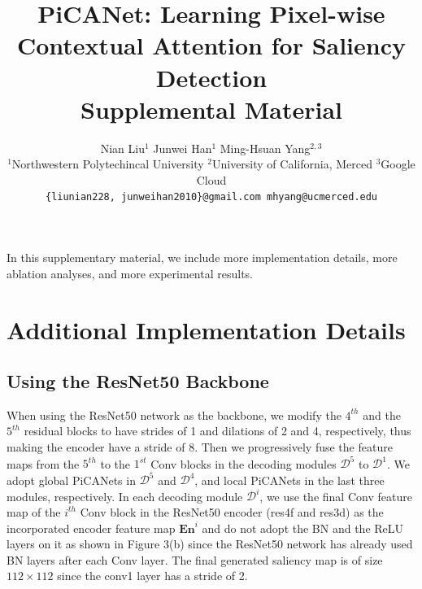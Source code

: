 \documentclass[10pt,twocolumn,letterpaper]{article}
\begin{document}
\title{PiCANet: Learning Pixel-wise Contextual Attention for Saliency Detection\\
Supplemental Material}

\author{
	Nian Liu$^{1}$
	\hspace{25pt}
	Junwei Han$^{1}$
	\hspace{25pt}
	Ming-Hsuan Yang$^{2,3}$
	\\
	$^1$Northwestern Polytechincal University
	\hspace{8pt}
	$^2$University of California, Merced
	\hspace{8pt}
	$^3$Google Cloud
	\\
	{\tt\small
    \{liunian228, junweihan2010\}@gmail.com
    \hspace{50pt}
    mhyang@ucmerced.edu
    }
}

\maketitle
\thispagestyle{empty}

In this supplementary material, we include more implementation details, more ablation analyses, and more experimental results.

\section{Additional Implementation Details}

\subsection{Using the ResNet50 Backbone}

When using the ResNet50 network \cite{he2016resnet} as the backbone, we modify the $4^{th}$ and the $5^{th}$ residual blocks to have strides of 1 and dilations of 2 and 4, respectively, thus making the encoder have a stride of 8. Then we progressively fuse the feature maps from the $5^{th}$ to the $1^{st}$ Conv blocks in the decoding modules $\mathcal D^5$ to $\mathcal D^1$. We adopt global PiCANets in $\mathcal D^5$ and $\mathcal D^4$, and local PiCANets in the last three modules, respectively. In each decoding module $\mathcal D^i$, we use the final Conv feature map of the $i^{th}$ Conv block in the ResNet50 encoder (\eg res4f and res3d) as the incorporated encoder feature map $\bm{En}^i$ and do not adopt the BN and the ReLU layers on it as shown in Figure 3(b) since the ResNet50 network has already used BN layers after each Conv layer. The final generated saliency map is of size $112\times 112$ since the conv1 layer has a stride of 2.
\end{document}
